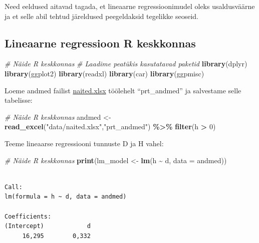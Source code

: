 \documentclass[
]{book}
\newenvironment{Shaded}{\begin{snugshade}}{\end{snugshade}}
\newcommand{\AttributeTok}[1]{\textcolor[rgb]{0.13,0.29,0.53}{#1}}
\newcommand{\CommentTok}[1]{\textcolor[rgb]{0.56,0.35,0.01}{\textit{#1}}}
\newcommand{\DecValTok}[1]{\textcolor[rgb]{0.00,0.00,0.81}{#1}}
\newcommand{\FunctionTok}[1]{\textcolor[rgb]{0.13,0.29,0.53}{\textbf{#1}}}
\newcommand{\NormalTok}[1]{#1}
\newcommand{\OtherTok}[1]{\textcolor[rgb]{0.56,0.35,0.01}{#1}}
\newcommand{\SpecialCharTok}[1]{\textcolor[rgb]{0.81,0.36,0.00}{\textbf{#1}}}
\newcommand{\StringTok}[1]{\textcolor[rgb]{0.31,0.60,0.02}{#1}}
\renewenvironment{Shaded} {\begin{snugshade}\footnotesize} {\end{snugshade}}
\begin{document}
Need eeldused aitavad tagada, et lineaarne regressioonimudel oleks usaldusväärne ja et selle abil tehtud järeldused peegeldaksid tegelikke seoseid.

\subsection{Lineaarne regressioon R keskkonnas}\label{lineaarne-regressioon-r-keskkonnas}

\begin{Shaded}
\begin{Highlighting}[]
\CommentTok{\# Näide R keskkonnas}
\CommentTok{\# Laadime peatükis kasutatavad paketid}
\FunctionTok{library}\NormalTok{(dplyr)}
\FunctionTok{library}\NormalTok{(ggplot2)}
\FunctionTok{library}\NormalTok{(readxl)}
\FunctionTok{library}\NormalTok{(car)}
\FunctionTok{library}\NormalTok{(ggpmisc)}
\end{Highlighting}
\end{Shaded}

Loeme andmed failist \href{data/naited.xlsx}{naited.xlsx} töölehelt ``prt\_andmed'' ja salvestame selle tabelisse:

\begin{Shaded}
\begin{Highlighting}[]
\CommentTok{\# Näide R keskkonnas}
\NormalTok{andmed }\OtherTok{\textless{}{-}} \FunctionTok{read\_excel}\NormalTok{(}\StringTok{"data/naited.xlsx"}\NormalTok{,}\StringTok{"prt\_andmed"}\NormalTok{) }\SpecialCharTok{\%\textgreater{}\%} \FunctionTok{filter}\NormalTok{(h }\SpecialCharTok{\textgreater{}} \DecValTok{0}\NormalTok{)}
\end{Highlighting}
\end{Shaded}

Teeme lineaarse regressiooni tunnuste D ja H vahel:

\begin{Shaded}
\begin{Highlighting}[]
\CommentTok{\# Näide R keskkonnas}
\FunctionTok{print}\NormalTok{(lm\_model }\OtherTok{\textless{}{-}} \FunctionTok{lm}\NormalTok{(h }\SpecialCharTok{\textasciitilde{}}\NormalTok{ d, }\AttributeTok{data =}\NormalTok{ andmed))}
\end{Highlighting}
\end{Shaded}

\begin{verbatim}

Call:
lm(formula = h ~ d, data = andmed)

Coefficients:
(Intercept)            d  
     16,295        0,332  
\end{verbatim}
\end{document}

